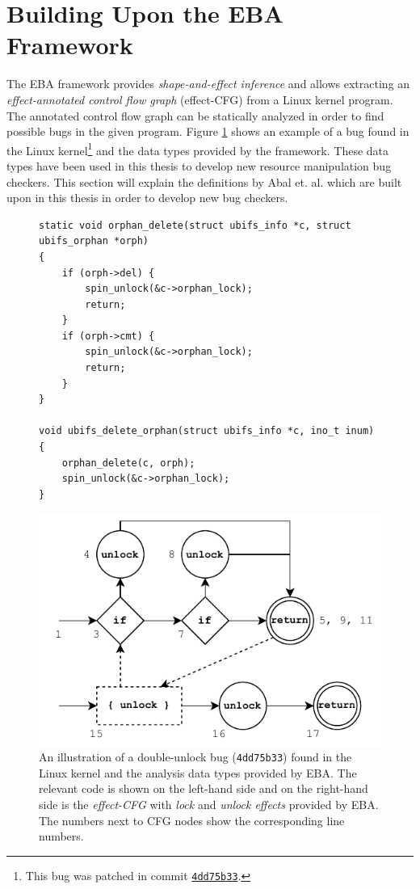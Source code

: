 \section{Building Upon the EBA Framework}
The EBA framework provides \textit{shape-and-effect inference} and allows extracting an \textit{effect-annotated control flow graph} (effect-CFG) from a Linux kernel program. The annotated control flow graph can be statically analyzed in order to find possible bugs in the given program. Figure \ref{initial-bug-visualisation} shows an example of a bug found in the Linux kernel\footnote{This bug was patched in commit \href{https://github.com/torvalds/linux/commit/4dd75b33}{\texttt{4dd75b33}}.} and the data types provided by the framework. These data types have been used in this thesis to develop new resource manipulation bug checkers. This section will explain the definitions by Abal et. al. \cite{Abal2017EffectiveBF} which are built upon in this thesis in order to develop new bug checkers. 

\begin{figure}[H]
\centering
\begin{minipage}{0.4\textwidth}
    \begin{verbatim}
static void orphan_delete(struct ubifs_info *c, struct ubifs_orphan *orph)
{
	if (orph->del) {
		spin_unlock(&c->orphan_lock);
		return;
	}
	if (orph->cmt) {
		spin_unlock(&c->orphan_lock);
		return;
	}
}

void ubifs_delete_orphan(struct ubifs_info *c, ino_t inum)
{
	orphan_delete(c, orph);
	spin_unlock(&c->orphan_lock);
}
\end{verbatim}
\end{minipage}
\hspace*{0.05\textwidth}
\begin{minipage}{0.45\textwidth}
    \includegraphics[width=\textwidth]{background/figures/annotated-cfg}
\end{minipage}
\caption{An illustration of a double-unlock bug (\texttt{4dd75b33}) found in the Linux kernel and the analysis data types provided by EBA. The relevant code is shown on the left-hand side and on the right-hand side is the \textit{effect-CFG} with \textit{lock} and \textit{unlock effects} provided by EBA. The numbers next to CFG nodes show the corresponding line numbers.}
\label{initial-bug-visualisation}
\end{figure}

